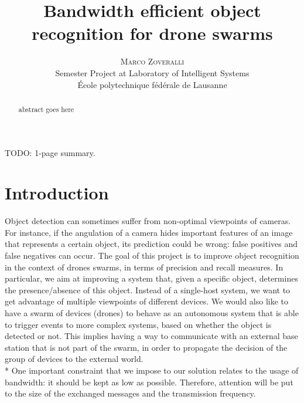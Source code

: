 \documentclass[10pt,conference,compsocconf]{IEEEtran}
\begin{document}
	
\pretitle{\begin{center}\Huge\bfseries} %
\posttitle{\end{center}} %
\title{Bandwidth efficient object recognition for drone swarms}

\author{
	\textsc{Marco Zoveralli} \\
	\normalsize{Semester Project at Laboratory of Intelligent Systems} \\
	\normalsize \'{E}cole polytechnique f\'{e}d\'{e}rale de Lausanne
}

\maketitle
TODO: 1-page summary.
\clearpage{}

\begin{abstract}
abstract goes here
\end{abstract}

\section{Introduction}
Object detection can sometimes suffer from non-optimal viewpoints of cameras. For instance, if the angulation of a camera hides important features of an image that represents a certain object, its prediction could be wrong: false positives and false negatives can occur. The goal of this project is to improve object recognition in the context of drones swarms, in terms of precision and recall measures. In particular, we aim at improving a system that, given a specific object, determines the presence/absence of this object.
Instead of a single-host system, we want to get advantage of multiple viewpoints of different devices. We would also like to have a swarm of devices (drones) to behave as an autonomous system that is able to trigger events to more complex systems, based on whether the object is detected or not. This implies having a way to communicate with an external base station that is not part of the swarm, in order to propagate the decision of the group of devices to the external world.\\*
One important constraint that we impose to our solution relates to the usage of bandwidth: it should be kept as low as possible. Therefore, attention will be put to the size of the exchanged messages and the transmission frequency. %
\end{document}
